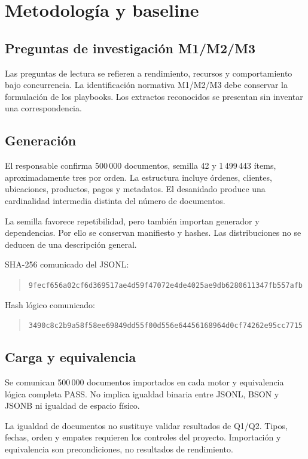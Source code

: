 \section{Metodología y baseline}
\subsection{Preguntas de investigación M1/M2/M3}
Las preguntas de lectura se refieren a rendimiento, recursos y
comportamiento bajo concurrencia. La identificación normativa M1/M2/M3
debe conservar la formulación de los playbooks. Los extractos reconocidos
se presentan sin inventar una correspondencia.


\subsection{Generación}
El responsable confirma 500\,000 documentos, semilla 42 y
1\,499\,443 ítems, aproximadamente tres por orden. La estructura incluye
órdenes, clientes, ubicaciones, productos, pagos y metadatos.
El desanidado produce una cardinalidad intermedia distinta del número
de documentos.

La semilla favorece repetibilidad, pero también importan generador y
dependencias. Por ello se conservan manifiesto y hashes. Las distribuciones
no se deducen de una descripción general.

SHA-256 comunicado del JSONL:
\begin{quote}\small
\nolinkurl{9fecf656a02cf6d369517ae4d59f47072e4de4025ae9db6280611347fb557afb}
\end{quote}
Hash lógico comunicado:
\begin{quote}\small
\nolinkurl{3490c8c2b9a58f58ee69849dd55f00d556e64456168964d0cf74262e95cc7715}
\end{quote}


\subsection{Carga y equivalencia}
Se comunican 500\,000 documentos importados en cada motor y equivalencia
lógica completa PASS. No implica igualdad binaria entre JSONL, BSON y
JSONB ni igualdad de espacio físico.

La igualdad de documentos no sustituye validar resultados de Q1/Q2.
Tipos, fechas, orden y empates requieren los controles del proyecto.
Importación y equivalencia son precondiciones, no resultados de rendimiento.

